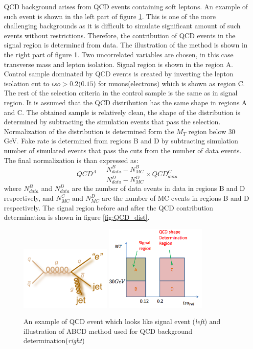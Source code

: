 QCD background arises from QCD events containing soft leptons. An example of such event is shown in the left part of figure \ref{fig:QCD}. This is one of the more challenging backgrounds as it is difficult to simulate significant amount of such events without restrictions. Therefore, the contribution of QCD events in the signal region is determined from data. The illustration of the method is shown in the right part of figure \ref{fig:QCD}. Two uncorrelated variables are chosen, in this case transverse mass and lepton isolation. Signal region is shown in the region A. Control sample dominated by QCD events is created by inverting the lepton isolation cut to $iso>0.2$($0.15$) for muons(electrons) which is shown as region C. The rest of the selection criteria in the control sample is the same as in signal region. It is assumed that the QCD distribution has the same shape in regions A and C. The obtained sample is relatively clean, the shape of the distribution is determined by subtracting the simulation events that pass the selection. Normalization of the distribution is determined form the $M_T$ region below 30 GeV. Fake rate is determined from regions B and D by subtracting simulation number of simulated events that pass the cuts from the number of data events. The final normalization is than expressed as:
\begin{equation}
QCD^A=\frac{N^B_{data}-N^B_{MC}}{N^D_{data}-N^D_{MC}}\times QCD^{C}_{data}
\end{equation}       
where $N^B_{data}$ and $N^D_{data}$ are the number of data events in data in regions B and D respectively, and $N^C_{MC}$ and $N^D_{MC}$ are the number of MC events in regions B and D respectively. The signal region before and after the QCD contribution determination is shown in figure \ref{fig:QCD_dist}.
\begin{figure}[htbp]
	\centering
		\includegraphics[width=0.4\textwidth]{Figures/QCD_diag.png}
		\includegraphics[width=0.45\textwidth]{Figures/QCD_AB.png}		
	\caption[QCD diagram and illustration of QCD background determination]{An example of QCD event which looks like signal event (\textit{left}) and illustration of ABCD method used for QCD background determination(\textit{right})}
	\label{fig:QCD}
\end{figure} 

